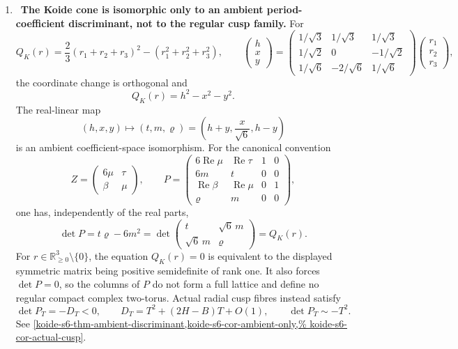 \begin{enumerate}[leftmargin=1.8em,itemsep=.65em]
\item \Verified\ \textbf{The Koide cone is isomorphic only to an
ambient period-coefficient discriminant, not to the regular cusp family.}
For
\[
 Q_K(r)=\frac23(r_1+r_2+r_3)^2-(r_1^2+r_2^2+r_3^2),\qquad
 \begin{pmatrix}h\\x\\y\end{pmatrix}
 =\begin{pmatrix}
 1/\sqrt3&1/\sqrt3&1/\sqrt3\\
 1/\sqrt2&0&-1/\sqrt2\\
 1/\sqrt6&-2/\sqrt6&1/\sqrt6
 \end{pmatrix}
 \begin{pmatrix}r_1\\r_2\\r_3\end{pmatrix},
\]
the coordinate change is orthogonal and
\[
 Q_K(r)=h^2-x^2-y^2.
\]
The real-linear map
\[
 (h,x,y)\longmapsto(t,m,\varrho)
 =\left(h+y,\frac{x}{\sqrt6},h-y\right)
\]
is an ambient coefficient-space isomorphism.  For the canonical convention
\[
 Z=\begin{pmatrix}6\mu&\tau\\\beta&\mu\end{pmatrix},\qquad
 P=\begin{pmatrix}
 6\operatorname{Re}\mu&\operatorname{Re}\tau&1&0\\
 6m&t&0&0\\
 \operatorname{Re}\beta&\operatorname{Re}\mu&0&1\\
 \varrho&m&0&0
 \end{pmatrix},
\]
one has, independently of the real parts,
\[
 \det P=t\varrho-6m^2
 =\det\begin{pmatrix}t&\sqrt6\,m\\\sqrt6\,m&\varrho\end{pmatrix}
 =Q_K(r).
\]
For \(r\in\mathbb R_{\ge0}^3\setminus\{0\}\), the equation
\(Q_K(r)=0\) is equivalent to the displayed symmetric matrix being
positive semidefinite of rank one.  It also forces \(\det P=0\), so
the columns of \(P\) do not form a full lattice and define no regular
compact complex two-torus.  Actual radial cusp fibres instead satisfy
\[
 \det P_T=-D_T<0,\qquad
 D_T=T^2+(2H-B)T+O(1),\qquad
 \det P_T\sim-T^2.
\]
See
\cref{koide-s6-thm-ambient-discriminant,koide-s6-cor-ambient-only,%
koide-s6-cor-actual-cusp}.


\end{enumerate}
